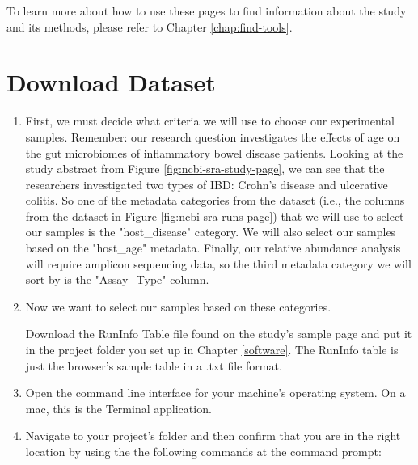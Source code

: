 To learn more about how to use these pages to find information about the study and its methods, please refer to Chapter \ref{chap:find-tools}. 
    
    \section{Download Dataset}
    
        \begin{enumerate}
            \item First, we must decide what criteria we will use to choose our experimental samples. 
            \newline
            Remember: our research question investigates the effects of age on the gut microbiomes of inflammatory bowel disease patients. Looking at the study abstract from Figure \ref{fig:ncbi-sra-study-page}, we can see that the researchers investigated two types of IBD: Crohn's disease and ulcerative colitis. So one of the metadata categories from the dataset (i.e., the columns from the dataset in Figure \ref{fig:ncbi-sra-runs-page}) that we will use to select our samples is the "host\_disease" category. We will also select our samples based on the "host\_age" metadata. Finally, our relative abundance analysis will require amplicon sequencing data, so the third metadata category we will sort by is the "Assay\_Type" column.
            
            \item Now we want to select our samples based on these categories. 
            
            Download the RunInfo Table file found on the study's sample page and put it in the project folder you set up in Chapter \ref{software}. The RunInfo table is just the browser's sample table in a .txt file format.
            
            \item Open the command line interface for your machine's operating system. On a mac, this is the Terminal application. 
            
            \item Navigate to your project's folder and then confirm that you are in the right location by using the the following commands at the command prompt:
            

\end{enumerate}
